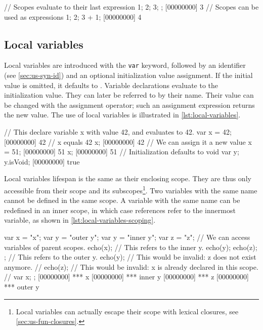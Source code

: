 \begin{urbiscript}[caption=Scopes,label=lst:scopes,float=\floatpos]
// Scopes evaluate to their last expression
{
  1;
  2;
  3;
};
[00000000] 3
// Scopes can be used as expressions
{1; 2; 3} + 1;
[00000000] 4
\end{urbiscript}

\subsection{Local variables}

Local variables are introduced with the \lstinline|var| keyword,
followed by an identifier (see \autoref{sec:us-syn-id}) and an optional
initialization value assignment. If the initial value is omitted, it
defaults to . Variable
declarations evaluate to
the initialization value. They can later be referred to by their
name. Their value can be changed with the assignment operator; such an
assignment expression returns the new value. The use of local
variables is illustrated in \autoref{lst:local-variables}.

\begin{urbiscript}[caption=Using local variables,
  label=lst:local-variables,float=\floatpos]
// This declare variable x with value 42, and evaluates to 42.
var x = 42;
[00000000] 42
// x equals 42
x;
[00000000] 42
// We can assign it a new value
x = 51;
[00000000] 51
x;
[00000000] 51
// Initialization defaults to void
var y;
y.isVoid;
[00000000] true
\end{urbiscript}

Local variables lifespan is the same as their enclosing scope. They
are thus only accessible from their scope and its
subscopes\footnote{Local variables can actually escape their scope
  with lexical closures, see \autoref{sec:us-fun-closures}.}. Two
variables with the same name cannot be defined in the same scope. A
variable with the same name can be redefined in an inner scope, in which
case references refer to the innermost variable, as shown in
\autoref{lst:local-variables-scoping}.

\begin{urbiscript}[caption=Local variables scoping,
  label=lst:local-variables-scoping,float=\floatpos]
{
  var x = "x";
  var y = "outer y";
  {
    var y = "inner y";
    var z = "z";
    // We can access variables of parent scopes.
    echo(x);
    // This refers to the inner y.
    echo(y);
    echo(z);
  };
  // This refers to the outer y.
  echo(y);
  // This would be invalid: z does not exist anymore.
  // echo(z);
  // This would be invalid: x is already declared in this scope.
  // var x;
};
[00000000] *** x
[00000000] *** inner y
[00000000] *** z
[00000000] *** outer y
\end{urbiscript}

